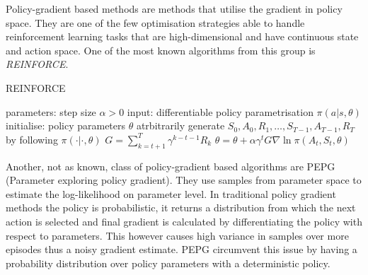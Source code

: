 Policy-gradient based methods are methods that utilise the gradient in policy space. They are one  of the few optimisation strategies able to handle reinforcement learning tasks that are high-dimensional and have continuous state and action space. One of the most known algorithms from this group is \emph{REINFORCE}.
\begin{algorithm}[h]
    \begin{algorithmic}[1]
    \caption{REINFORCE}
    \label{alg:reinforce}
        \State parameters: step size $\alpha>0$ 
        \State input: differentiable policy parametrisation $\pi(a|s,\theta)$
        \State initialise: policy parameters $\theta$ atrbitrarily
            \State generate $S_0, A_0, R_1,\dots,S_{T-1},A_{T-1},R_T$ by following $\pi(\cdot|\cdot,\theta)$
                \State $G = \sum_{k=t+1}^T\gamma^{k-t-1}R_k$
                \State $\theta = \theta + \alpha \gamma^t G \nabla\ln\pi(A_t,S_t,\theta)$
            \EndFor
        \EndFor
    \end{algorithmic}
\end{algorithm}


Another, not as known, class of policy-gradient based algorithms are PEPG (Parameter exploring policy gradient).\cite{Sehnke2012} They use samples from parameter space to estimate the log-likelihood on parameter level. In traditional policy gradient methods the policy is probabilistic, it returns a distribution from which the next action is selected and final gradient is calculated by differentiating the policy with respect to parameters. This however causes high variance in samples over more episodes thus a noisy gradient estimate. PEPG circumvent this issue by having a probability distribution over policy parameters with a deterministic policy.


